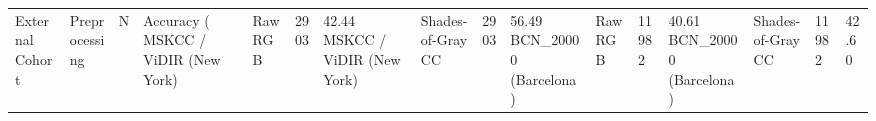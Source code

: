 \begin{tabular}{llrllll}
\toprule
External Cohort & Preprocessing & N & Accuracy (%
\midrule
MSKCC / ViDIR (New York) & Raw RGB & 2903 & 42.44%
MSKCC / ViDIR (New York) & Shades-of-Gray CC & 2903 & 56.49%
BCN_20000 (Barcelona) & Raw RGB & 11982 & 40.61%
BCN_20000 (Barcelona) & Shades-of-Gray CC & 11982 & 42.60%
\bottomrule
\end{tabular}
